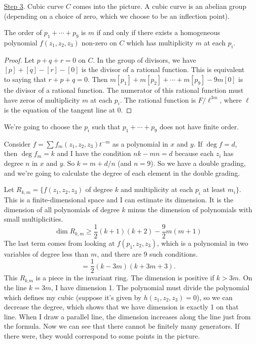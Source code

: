 \underline{Step 3}. Cubic curve $C$ comes into the picture. A cubic curve is an abelian group (depending on a choice of zero, which we choose to be an inflection point).
\begin{claim}
 The order of $p_1+\cdots +p_9$ is $m$ if and only if there exists a homogeneous polynomial $f(z_1,z_2,z_3)$ non-zero on $C$ which has multiplicity $m$ at each $p_i$.
\end{claim}
\begin{proof}
 Let $p+q+r=0$ on $C$. In the group of divisors, we have $[p]+[q]-[r]-[0]$ is the divisor of a rational function. This is equivalent to saying that $r+p+q=0$. Then $m[p_1]+m[p_2]+\cdots + m[p_9]-9m[0]$ is the divisor of a rational function. The numerator of this rational function must have zeros of multiplicity $m$ at each $p_i$. The rational function is $F/\ell^{3m}$, where $\ell$ is the equation of the tangent line at 0.
\end{proof}
We're going to choose the $p_i$ such that $p_1+\cdots +p_9$ does not have finite order.

Consider $f=\sum f_m(z_1,z_2,z_3)t^{-m}$ as a polynomial in $x$ and $y$. If $\deg f=d$, then $\deg f_m=k$ and I have the condition $nk-mn=d$ because each $z_i$ has degree $n$ in $x$ and $y$. So $k=m+d/n$ (and $n=9$). So we have a double grading, and we're going to calculate the degree of each element in the double grading.

Let $R_{k,m}=\{f(z_1,z_2,z_3)$ of degree $k$ and multiplicity at each $p_i$ at least $m_i\}$. This is a finite-dimensional space and I can estimate its dimension. It is the dimension of all polynomials of degree $k$ minus the dimension of polynomials with small multiplicities.
\[
 \dim R_{k,m} \ge \frac{1}{2} (k+1)(k+2) - \frac 92 m(m+1)
\]
The last term comes from looking at $f(p_1,z_2,z_3)$, which is a polynomial in two variables of degree less than $m$, and there are 9 such conditions.
\[
 = \frac 12 (k-3m)(k+3m+3).
\]
This $R_{k.m}$ is a piece in the invariant ring. The dimension is positive if $k>3m$. On the line $k=3m$, I have dimension 1. The polynomial must divide the polynomial which defines my cubic (suppose it's given by $h(z_1,z_2,z_3)=0$), so we can decrease the degree, which shows that we have dimension is exactly 1 on that line. When I draw a parallel line, the dimension increases along the line just from the formula. Now we can see that there cannot be finitely many generators. If there were, they would correspond to some points in the picture.


